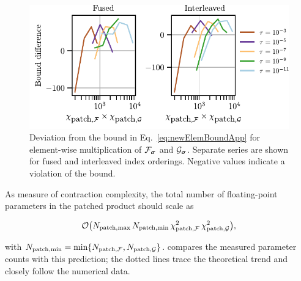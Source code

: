 \begin{figure}[htpb]
    \centering
    \includegraphics{figures/elemMulBounds.pdf}
    \caption{Deviation from the bound
           in Eq.~\eqref{eq:newElemBoundApp} for element-wise
           multiplication of \(\mathcal{F}_{\boldsymbol{\sigma}}\) and \(\mathcal{G}_{\boldsymbol{\sigma}}\).
           Separate series are shown for fused and interleaved index
           orderings.  Negative values indicate a violation of the bound.}
    \label{fig:elemMulBounds}
\end{figure}

As measure of contraction complexity, the total number of floating-point parameters in the patched product should scale as

\begin{equation}
  \mathcal{O} \bigl(
    N_{\text{patch},\max}\,
    N_{\text{patch},\min}\,
    \chi_{\text{patch},\mathcal{F}}^{2}\,
    \chi_{\text{patch},\mathcal{G}}^{2}
  \bigr),
  \label{eq:newElemScalingApp}
\end{equation}

with \(N_{\text{patch},\min} =\min\{N_{\text{patch},\mathcal{F}},N_{\text{patch},\mathcal{G}}\}\).
 compares the measured parameter
counts with this prediction; the dotted lines trace the theoretical trend and
closely follow the numerical data.

